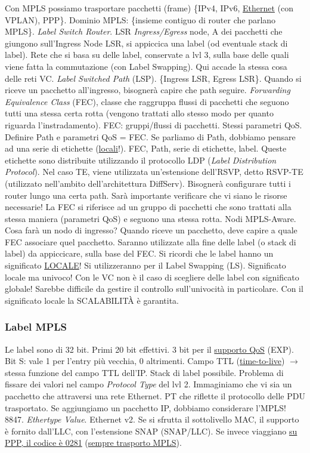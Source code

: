 Con MPLS possiamo trasportare pacchetti (frame) \{IPv4, IPv6, \underline{Ethernet} (con VPLAN), PPP\}. Dominio MPLS: \{insieme contiguo di router che parlano MPLS\}. \textit{Label Switch Router}. LSR \textit{Ingress/Egress} node, A dei pacchetti che giungono sull'Ingress Node LSR, si appiccica una label (od eventuale stack di label). Rete che si basa su delle label, conservate a lvl 3, sulla base delle quali viene fatta la commutazione (con Label Swapping). Qui accade la stessa cosa delle reti VC. \textit{Label Switched Path} (LSP). \{Ingress LSR, Egress LSR\}. Quando si riceve un pacchetto all'ingresso, bisognerà capire che path seguire. \textit{Forwarding Equivalence Class} (FEC), classe che raggruppa flussi di pacchetti che seguono tutti una stessa certa rotta (vengono trattati allo stesso modo per quanto riguarda l'instradamento). FEC: gruppi/flussi di pacchetti. Stessi parametri QoS. Definire Path e parametri QoS = FEC. Se parliamo di Path, dobbiamo pensare ad una serie di etichette (\underline{locali}!). FEC, Path, serie di etichette, label. Queste etichette sono distribuite utilizzando il protocollo LDP (\textit{Label Distribution Protocol}). Nel caso TE, viene utilizzata un'estensione dell'RSVP, detto RSVP-TE (utilizzato nell'ambito dell'architettura DiffServ). Bisognerà configurare tutti i router lungo una certa path. Sarà importante verificare che vi siano le risorse necessarie! La FEC si riferisce ad un gruppo di pacchetti che sono trattati alla stessa maniera (parametri QoS) e seguono una stessa rotta. Nodi MPLS-Aware. Cosa farà un nodo di ingresso? Quando riceve un pacchetto, deve capire a quale FEC associare quel pacchetto. Saranno utilizzate alla fine delle label (o stack di label) da appiccicare, sulla base del FEC. Si ricordi che le label hanno un significato \underline{LOCALE}! Si utilizzeranno per il Label Swapping (LS). Significato locale ma univoco! Con le VC non è il caso di scegliere delle label con significato globale! Sarebbe difficile da gestire il controllo sull'univocità in particolare. Con il significato locale la SCALABILIT\`A è garantita.

\subsubsection{Label MPLS}

Le label sono di 32 bit. Primi 20 bit effettivi. 3 bit per il \underline{supporto QoS} (EXP). Bit S: vale 1 per l'entry più vecchia, 0 altrimenti. Campo TTL (\underline{time-to-live}) $\rightarrow$ stessa funzione del campo TTL dell'IP.
Stack di label possibile. Problema di fissare dei valori nel campo \textit{Protocol Type} del lvl 2. Immaginiamo che vi sia un pacchetto che attraversi una rete Ethernet. PT che riflette il protocollo delle PDU trasportato. Se aggiungiamo un pacchetto IP, dobbiamo considerare l'MPLS! 8847. \textit{Ethertype Value}. Ethernet v2. Se si sfrutta il sottolivello MAC, il supporto è fornito dall'LLC, con l'estensione SNAP (SNAP/LLC). Se invece viaggiano \underline{su PPP, il codice è 0281} (\underline{sempre trasporto MPLS}).

